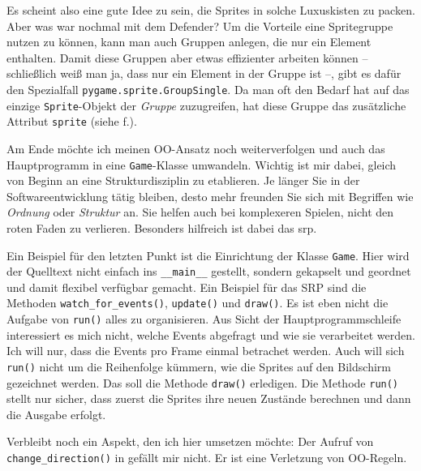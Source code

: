 Es scheint also eine gute Idee zu sein, die Sprites in solche Luxuskisten zu packen. Aber was war nochmal mit dem Defender? Um die Vorteile eine Spritegruppe nutzen zu können, kann man auch Gruppen anlegen, die nur ein Element enthalten. Damit diese Gruppen aber etwas effizienter arbeiten können -- schließlich weiß man ja, dass nur ein Element in der Gruppe ist --, gibt es dafür den Spezialfall \texttt{pygame.sprite.GroupSingle}. Da man oft den Bedarf hat auf das einzige \texttt{Sprite}-Objekt der \emph{Gruppe} zuzugreifen, hat diese Gruppe das zusätzliche Attribut \texttt{sprite} (siehe f.).


Am Ende möchte ich meinen OO-Ansatz noch weiterverfolgen und auch das Hauptprogramm in eine \texttt{Game}-Klasse umwandeln. Wichtig ist mir dabei, gleich von Beginn an eine Strukturdisziplin zu etablieren. Je länger Sie in der Softwareentwicklung tätig bleiben, desto mehr freunden Sie sich mit Begriffen wie \emph{Ordnung} oder \emph{Struktur} an. Sie helfen auch bei komplexeren Spielen, nicht den roten Faden zu verlieren. Besonders hilfreich ist dabei das \Gls{srp}.

\newpage
{}

Ein Beispiel für den letzten Punkt ist die Einrichtung der Klasse \texttt{Game}. Hier wird der Quelltext nicht einfach ins \texttt{\_\_main\_\_} gestellt, sondern gekapselt und geordnet und damit flexibel verfügbar gemacht. Ein Beispiel für das SRP sind die Methoden \texttt{watch\_for\_e\-vents()}, \texttt{update()} und \texttt{draw()}. Es ist eben nicht die Aufgabe von \texttt{run()} alles zu organisieren. Aus Sicht der Hauptprogrammschleife interessiert es mich nicht, welche Events abgefragt und wie sie verarbeitet werden. Ich will nur, dass die Events pro Frame einmal betrachet werden. Auch will sich \texttt{run()} nicht um die Reihenfolge kümmern, wie die Sprites auf den Bildschirm gezeichnet werden. Das soll die Methode \texttt{draw()} erledigen. Die Methode \texttt{run()} stellt nur sicher, dass zuerst die Sprites ihre neuen Zustände berechnen und dann die Ausgabe erfolgt.


Verbleibt noch ein Aspekt, den ich hier umsetzen möchte: Der Aufruf von \texttt{change\_di\-rec\-tion()} in  gefällt mir nicht. Er ist eine Verletzung von OO-Regeln. 

